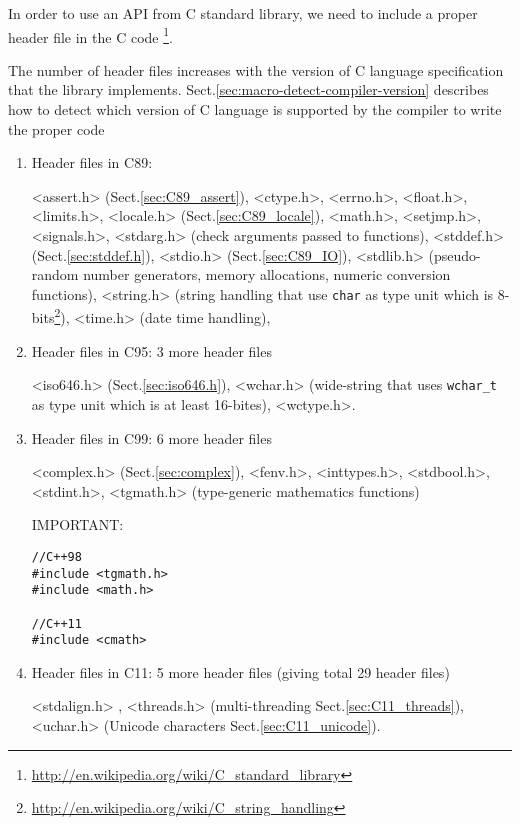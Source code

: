 In order to use an API from C standard library, we need to include a proper
header file in the C code
\footnote{\url{http://en.wikipedia.org/wiki/C_standard_library}}. 

The number of header files increases with the version of C language
specification that the library implements. 
Sect.\ref{sec:macro-detect-compiler-version} describes how to detect which
version of C language is supported by the compiler to write the proper code
\begin{enumerate}
  
  \item Header files in C89: 
  
  <assert.h> (Sect.\ref{sec:C89_assert}), <ctype.h>,
  <errno.h>, <float.h>, <limits.h>, <locale.h> (Sect.\ref{sec:C89_locale}),
  <math.h>, <setjmp.h>, <signals.h>, <stdarg.h> (check arguments passed to
  functions), <stddef.h> (Sect.\ref{sec:stddef.h}), <stdio.h>
  (Sect.\ref{sec:C89_IO}), <stdlib.h> (pseudo-random number generators, memory
  allocations, numeric conversion functions), <string.h> (string handling that
  use \verb!char! as type unit which is
  8-bits\footnote{\url{http://en.wikipedia.org/wiki/C_string_handling}}),
  <time.h> (date time handling),
  
  \item Header files in C95:  3 more header files
  
  <iso646.h> (Sect.\ref{sec:iso646.h}), <wchar.h> (wide-string that uses
  \verb!wchar_t! as type unit which is at least 16-bites), <wctype.h>.
  
  \item Header files in C99: 6 more header files 
  
  <complex.h> (Sect.\ref{sec:complex}), <fenv.h>, <inttypes.h>, <stdbool.h>,
  <stdint.h>, <tgmath.h> (type-generic mathematics functions)

IMPORTANT:
\begin{verbatim}
//C++98
#include <tgmath.h>
#include <math.h>

//C++11
#include <cmath>
\end{verbatim}  

  \item Header files in C11: 5 more header files (giving total 29 header files) 
  
  <stdalign.h> , <threads.h> (multi-threading Sect.\ref{sec:C11_threads}),
  <uchar.h> (Unicode characters Sect.\ref{sec:C11_unicode}).

\end{enumerate}

